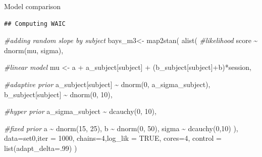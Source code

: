 \documentclass[
  ignorenonframetext,
]{beamer}
\newenvironment{Shaded}{\begin{snugshade}}{\end{snugshade}}
\newcommand{\AttributeTok}[1]{\textcolor[rgb]{0.77,0.63,0.00}{#1}}
\newcommand{\CommentTok}[1]{\textcolor[rgb]{0.56,0.35,0.01}{\textit{#1}}}
\newcommand{\ConstantTok}[1]{\textcolor[rgb]{0.00,0.00,0.00}{#1}}
\newcommand{\DecValTok}[1]{\textcolor[rgb]{0.00,0.00,0.81}{#1}}
\newcommand{\FunctionTok}[1]{\textcolor[rgb]{0.00,0.00,0.00}{#1}}
\newcommand{\NormalTok}[1]{#1}
\newcommand{\OtherTok}[1]{\textcolor[rgb]{0.56,0.35,0.01}{#1}}
\newcommand{\SpecialCharTok}[1]{\textcolor[rgb]{0.00,0.00,0.00}{#1}}
\begin{document}
\begin{frame}[fragile]{Model comparison}
\begin{verbatim}
## Computing WAIC
\end{verbatim}

\begin{Shaded}
\begin{Highlighting}[]
\CommentTok{\#adding random slope by subject}
\NormalTok{bays\_m3}\OtherTok{\textless{}{-}} \FunctionTok{map2stan}\NormalTok{(}
  \FunctionTok{alist}\NormalTok{(}
    \CommentTok{\#likelihood}
\NormalTok{    score }\SpecialCharTok{\textasciitilde{}} \FunctionTok{dnorm}\NormalTok{(mu, sigma),}
    
    \CommentTok{\#linear model}
\NormalTok{    mu }\OtherTok{\textless{}{-}}\NormalTok{ a }\SpecialCharTok{+}\NormalTok{ a\_subject[subject] }\SpecialCharTok{+}\NormalTok{ (b\_subject[subject]}\SpecialCharTok{+}\NormalTok{b)}\SpecialCharTok{*}\NormalTok{session,}
    

    
    \CommentTok{\#adaptive prior}
\NormalTok{    a\_subject[subject] }\SpecialCharTok{\textasciitilde{}} \FunctionTok{dnorm}\NormalTok{(}\DecValTok{0}\NormalTok{, a\_sigma\_subject),}
\NormalTok{    b\_subject[subject] }\SpecialCharTok{\textasciitilde{}} \FunctionTok{dnorm}\NormalTok{(}\DecValTok{0}\NormalTok{, }\DecValTok{10}\NormalTok{),}

    \CommentTok{\#hyper prior}
\NormalTok{    a\_sigma\_subject }\SpecialCharTok{\textasciitilde{}} \FunctionTok{dcauchy}\NormalTok{(}\DecValTok{0}\NormalTok{, }\DecValTok{10}\NormalTok{),}

    \CommentTok{\#fixed prior}
\NormalTok{    a }\SpecialCharTok{\textasciitilde{}} \FunctionTok{dnorm}\NormalTok{(}\DecValTok{15}\NormalTok{, }\DecValTok{25}\NormalTok{),}
\NormalTok{    b }\SpecialCharTok{\textasciitilde{}} \FunctionTok{dnorm}\NormalTok{(}\DecValTok{0}\NormalTok{, }\DecValTok{50}\NormalTok{),}
\NormalTok{    sigma }\SpecialCharTok{\textasciitilde{}} \FunctionTok{dcauchy}\NormalTok{(}\DecValTok{0}\NormalTok{,}\DecValTok{10}\NormalTok{)}
\NormalTok{  ),}
  \AttributeTok{data=}\NormalTok{set0,}\AttributeTok{iter =} \DecValTok{1000}\NormalTok{,}
  \AttributeTok{chains=}\DecValTok{4}\NormalTok{,}\AttributeTok{log\_lik =} \ConstantTok{TRUE}\NormalTok{,}
  \AttributeTok{cores=}\DecValTok{4}\NormalTok{, }\AttributeTok{control =} \FunctionTok{list}\NormalTok{(}\AttributeTok{adapt\_delta=}\NormalTok{.}\DecValTok{99}\NormalTok{)}
\NormalTok{)}
\end{Highlighting}
\end{Shaded}


\end{frame}
\end{document}
